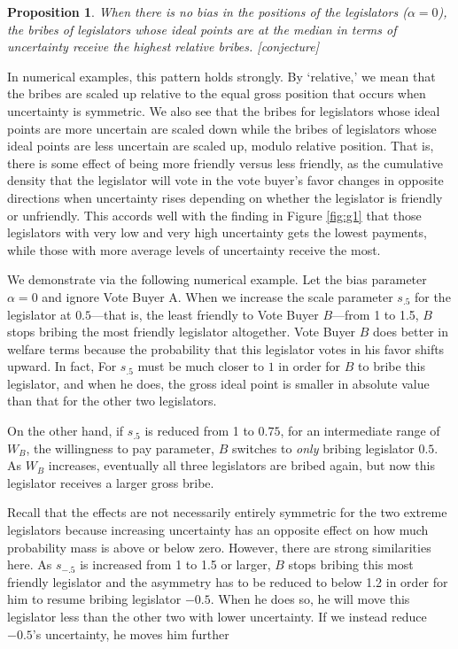 \documentclass[12pt]{article}
\newtheorem{proposition}{Proposition}
\newcommand{\al}{\alpha}
\begin{document}
\begin{proposition}
  When there is no bias in the positions of the legislators ($\al =0$), the bribes of legislators whose ideal points are at the median in terms of uncertainty receive the highest relative bribes. [conjecture]
	\label{prop:asym}
\end{proposition}
In numerical examples, this pattern holds strongly. By `relative,' we mean that the bribes are scaled up relative to the equal gross position that occurs when uncertainty is symmetric. We also see that the bribes for legislators whose ideal points are more uncertain are scaled down while the bribes of legislators whose ideal points are less uncertain are scaled up, modulo relative position. That is, there is some effect of being more friendly versus less friendly, as the cumulative density that the legislator will vote in the vote buyer's favor changes in opposite directions when uncertainty rises depending on whether the legislator is friendly or unfriendly. This accords well with the finding in Figure \ref{fig:g1} that those legislators with very low and very high uncertainty gets the lowest payments, while those with more average levels of uncertainty receive the most.

We demonstrate via the following numerical example. Let the bias parameter $\al=0$ and ignore Vote Buyer A. When we increase the scale parameter $s_{.5}$ for the legislator at $0.5$---that is, the least friendly to Vote Buyer $B$---from 1 to 1.5, $B$ stops bribing the most friendly legislator altogether. Vote Buyer $B$ does better in welfare terms because the probability that this legislator votes in his favor shifts upward. In fact, For $s_{.5}$ must be much closer to $1$ in order for $B$ to bribe this legislator, and when he does, the gross ideal point is smaller in absolute value than that for the other two legislators.

On the other hand, if $s_{.5}$ is reduced from 1 to $0.75$, for an intermediate range of $W_B$, the willingness to pay parameter, $B$ switches to \textit{only} bribing legislator $0.5$. As $W_B$ increases, eventually all three legislators are bribed again, but now this legislator receives a larger gross bribe.

Recall that the effects are not necessarily entirely symmetric for the two extreme legislators because increasing uncertainty has an opposite effect on how much probability mass is above or below zero. However, there are strong similarities here. As $s_{-.5}$ is increased from 1 to 1.5 or larger, $B$ stops bribing this most friendly legislator and the asymmetry has to be reduced to below 1.2 in order for him to resume bribing legislator $-0.5$. When he does so, he will move this legislator less than the other two with lower uncertainty. If we instead reduce $-0.5$'s uncertainty, he moves him further
		
\end{document}
